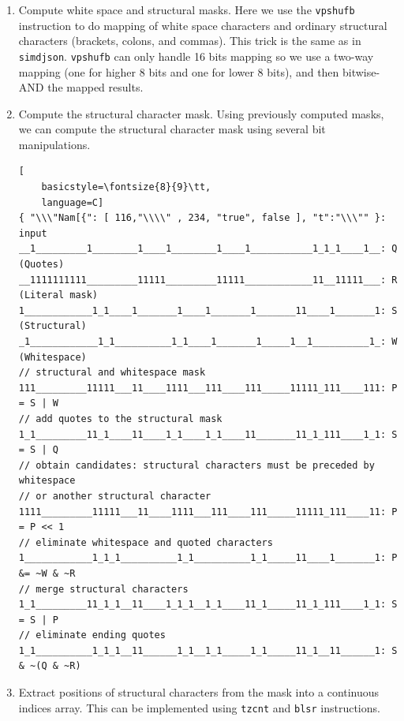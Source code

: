 \documentclass[11pt]{article}
\begin{document}
\begin{enumerate}
\begin{lstlisting}[
    basicstyle=\fontsize{8}{9}\tt,
    language=C]
{ "\\\"Nam[{": [ 116,"\\\\" , 234, "true", false ], "t":"\\\"" }: input
__1___1_____1________1____1________1____1___________1_1_1___11__: Q (Quotes)
______1_____________________________________________________1___: OD (Escape mask)
__1_________1________1____1________1____1___________1_1_1____1__: Q &= ~OD
__1111111111_________11111_________11111____________11__11111___: R = CLMUL(Q, ~0)
\end{lstlisting}
    \item Compute white space and structural masks. Here we use the \texttt{vpshufb} instruction to do mapping of white space characters and ordinary structural characters (brackets, colons, and commas). This trick is the same as in \texttt{simdjson}. \texttt{vpshufb} can only handle 16 bits mapping so we use a two-way mapping (one for higher 8 bits and one for lower 8 bits), and then bitwise-AND the mapped results.
    \item Compute the structural character mask. Using previously computed masks, we can compute the structural character mask using several bit manipulations.
\begin{lstlisting}[
    basicstyle=\fontsize{8}{9}\tt,
    language=C]
{ "\\\"Nam[{": [ 116,"\\\\" , 234, "true", false ], "t":"\\\"" }: input
__1_________1________1____1________1____1___________1_1_1____1__: Q (Quotes)
__1111111111_________11111_________11111____________11__11111___: R (Literal mask)
1____________1_1____1_______1____1_______1_______11____1_______1: S (Structural)
_1____________1_1__________1_1____1_______1_____1__1__________1_: W (Whitespace)
// structural and whitespace mask
111_________11111___11____1111___111____111_____11111_111____111: P = S | W
// add quotes to the structural mask
1_1_________11_1____11____1_1____1_1____11_______11_1_111____1_1: S = S | Q
// obtain candidates: structural characters must be preceded by whitespace
// or another structural character
1111_________11111___11____1111___111____111_____11111_111____11: P = P << 1
// eliminate whitespace and quoted characters
1____________1_1_1__________1_1__________1_1_____11____1_______1: P &= ~W & ~R
// merge structural characters
1_1_________11_1_1__11____1_1_1__1_1____11_1_____11_1_111____1_1: S = S | P
// eliminate ending quotes
1_1__________1_1_1__11______1_1__1_1_____1_1_____11_1__11______1: S & ~(Q & ~R)
\end{lstlisting}
    \item Extract positions of structural characters from the mask into a continuous indices array. This can be implemented using \texttt{tzcnt} and \texttt{blsr} instructions.
\end{enumerate}
\end{document}
